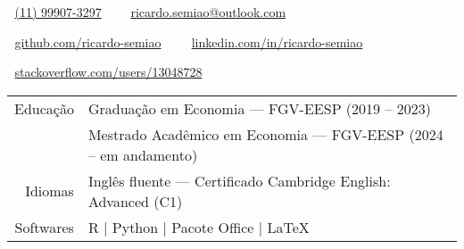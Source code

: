\documentclass[11pt,letterpaper]{article}
\begin{document}

\noindent\begin{minipage}[c]{\textwidth} \centering
\faWhatsapp $\;$ \href{https://api.whatsapp.com/send?phone=5511999073297}{(11) 99907-3297} $\;$ \textbullet $\;\;$ \faEnvelopeO\ \href{mailto:ricardo.semiao@outlook.com}{ricardo.semiao@outlook.com}

\faGithub $\;$ \href{https://github.com/ricardo-semiao}{github.com/ricardo-semiao} $\;$ \textbullet $\;\;$ \faLinkedin $\;$ \href{https://linkedin.com/in/ricardo-semiao}{linkedin.com/in/ricardo-semiao}

\faStackOverflow $\;$ \href{https://stackoverflow.com/users/13048728}{stackoverflow.com/users/13048728}
\end{minipage} \par\vspace{0.5cm}


\vspace{-0.5cm}
\begin{tabular}{rl}
Educação & Graduação em Economia --- FGV-EESP (2019 -- 2023)\\[0.3cm]
 & Mestrado Acadêmico em Economia --- FGV-EESP (2024 -- em andamento)\\[0.3cm]
Idiomas & Inglês fluente --- Certificado Cambridge English: Advanced (C1)\\[0.3cm]
Softwares & R | Python | Pacote Office | LaTeX %
\end{tabular}
\end{document}
